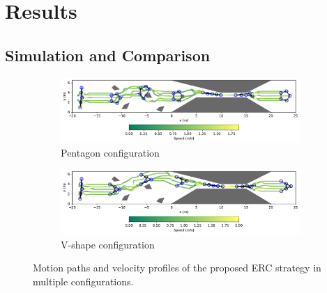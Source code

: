 \section{Results}\label{sec4}
\subsection{Simulation and Comparison}
\begin{figure}[!h]
\begin{subfigure}[b]{\textwidth}
    
    \centering
    \includegraphics[width=\textwidth]{paper2/images/path_edc_shape1.pdf}
    \caption{Pentagon configuration}
    \label{fig:1path_edc1}
\end{subfigure}
\begin{subfigure}[b]{\textwidth}
    \centering
    \includegraphics[width=\textwidth]{paper2/images/path_edc_shape2.pdf}
    \caption{V-shape configuration}
    \label{fig:1path_edc2}
\end{subfigure}
\caption{Motion paths and velocity profiles of the proposed ERC strategy in multiple configurations.}
\label{fig:1path}
\end{figure}

